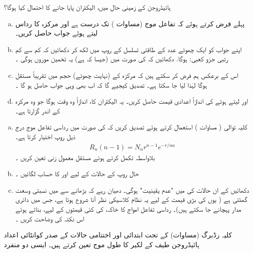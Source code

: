 ہائیڈروجن کے  زمینی حال میں، الیکٹران پایا  جانے کا احتمال کیا ہوگا؟ 
\begin{enumerate}[a.]
\item
پہلے  فرض کرتے ہوئے کہ تفاعل موج  (مساوات  )     تک درست ہے اور مرکزہ کا رداس  لیتے ہوئے  جواب حاصل کریں۔ 
\item
اپنے جواب کو ایک چھوٹے عدد  کے  طاقتی تسلسل کے روپ میں لکھ کر دکھائیں کہ کم سے کم  رتبی  جزو کعبی:     ہوگا.  دکھائیں  کہ  کی صورت میں (جیسا کہ ہے) یہ تخمین موزوں ہوگی ۔
 \item
اس کے برعکس ہم فرض کر سکتے ہیں کہ مرکزہ کے  (نہایت  چھوٹے)  حجم میں  تقریباً مستقل ہوگا لہٰذا  لیا جا سکتا ہے۔ تصدیق کیجیے گا کہ اب بھی وہی جواب حاصل  ہو گا ۔
\item
{} اور  لیتے ہوئے  کی اندازاً اعدادی قیمت حاصل کریں۔ یہ الیکٹران کا،  اندازاً وہ وقت ہوگا جو  وہ مرکزہ کے اندر گزارتا ہے۔ 
\end{enumerate}
\begin{enumerate}[a.]
\item
کلیہ توالی ( مساوات )  استعمال کرتے ہوئے تصدیق کریں کہ  کی صورت میں رداسی تفاعل موج درج ذیل روپ اختیار کرتا ہے۔ 
\begin{align*}
R_n (n - 1) = N_n r^{n - 1} e^{-r/na}
\end{align*}
بلاواسطہ تکمل کرتے ہوئے مستقل معمول زنی  تعین کریں ۔
\item
حال  روپ کے حالات کے لیے  اور  کا حساب لگائیں ۔
\item
دکھائیں کے ان حالات کی   میں "عدم یقینیت"   ہوگی۔ دھیان رہے کہ    بڑھانے سے  میں نسبتی   وسعت  گھٹتی ہے ( یوں  کی بڑی قیمت کے لیے یہ  نظام کلاسیکی نظر آنا شروع ہوتا ہے، جس میں دائری مدار پہچانے جا سکتے ہیں)۔ رداسی تفاعل امواج کا خاکہ،    کی کئی قیمتوں کے لیے،  بناتے ہوئے اس نکتہ  کی وضاحت کریں ۔
\end{enumerate}
\quad
 کلیہ رڈبرگ (مساوات) کے تحت ابتدائی اور اختتامی حالات کے صدر کوانٹائی اعداد ہائیڈروجن   طیف  کے لکیر کا طول موج تعین کرتے ہیں۔ ایسی دو منفرد

